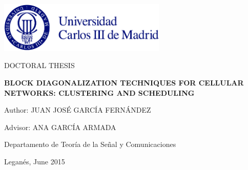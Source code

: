 \thispagestyle{plain}
{\Large
\centering

\vspace*{\fill}

\includegraphics[width=0.6\textwidth]{./00.foreword/img/logo_uc3m} 

\vspace*{2cm}

DOCTORAL THESIS

\vspace*{2cm}

{\bf
BLOCK DIAGONALIZATION TECHNIQUES FOR CELLULAR NETWORKS:
CLUSTERING AND SCHEDULING
}

\vspace*{2cm}

Author: JUAN JOSÉ GARCÍA FERNÁNDEZ

Advisor: ANA GARCÍA ARMADA

\vspace*{2cm}

Departamento de Teoría de la Señal y Comunicaciones

\vspace*{2cm}

Leganés, June 2015

\vspace*{\fill}

} %
